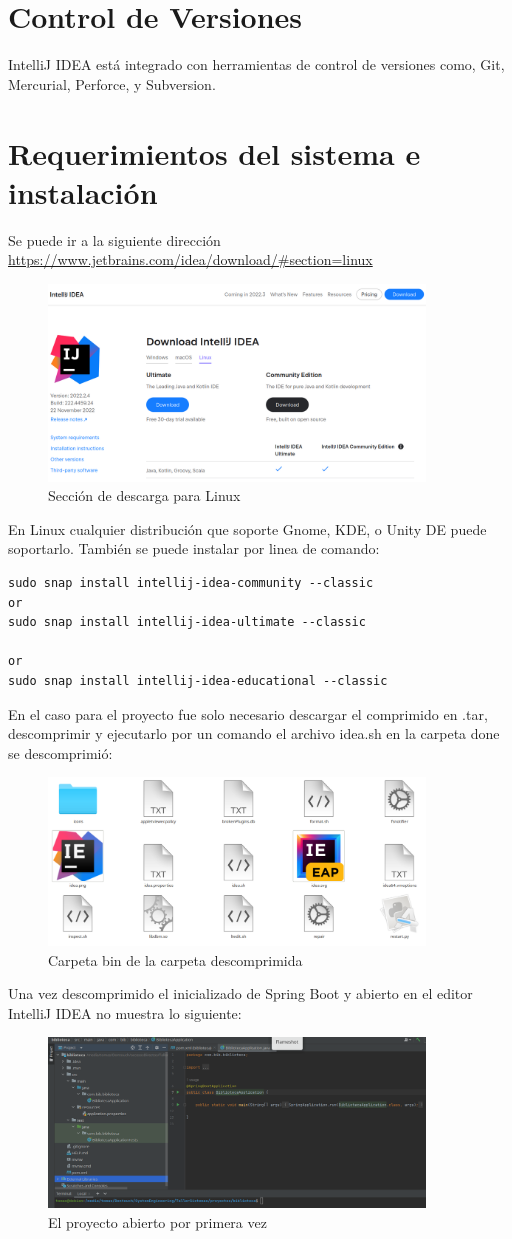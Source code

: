 \section{Control de Versiones}
IntelliJ IDEA está integrado con herramientas de control de versiones como, Git, Mercurial, Perforce, y Subversion. 
\section{Requerimientos del sistema e instalación}
Se puede ir a la siguiente dirección \url{https://www.jetbrains.com/idea/download/#section=linux}
\begin{figure}[h]
\centering
\includegraphics[width=10cm]{images/idea1}
\caption{Sección de descarga para Linux}
\end{figure}
En Linux cualquier distribución que soporte Gnome, KDE, o Unity DE puede soportarlo.
También se puede instalar por linea de comando:
\begin{verbatim}
sudo snap install intellij-idea-community --classic
or
sudo snap install intellij-idea-ultimate --classic

or
sudo snap install intellij-idea-educational --classic
\end{verbatim}
En el caso para el proyecto fue solo necesario descargar el comprimido en .tar, descomprimir y ejecutarlo por un comando el archivo idea.sh en la carpeta done se descomprimió:
\begin{figure}[h]
\centering
\includegraphics[width=10cm]{images/idea4}
\caption{Carpeta bin de la carpeta descomprimida}
\end{figure}

Una vez descomprimido el inicializado de Spring Boot y abierto en el editor IntelliJ IDEA no muestra lo siguiente:
\begin{figure}[h]
\centering
\includegraphics[width=10cm]{images/idea2}
\caption{El proyecto abierto por primera vez}
\end{figure}
